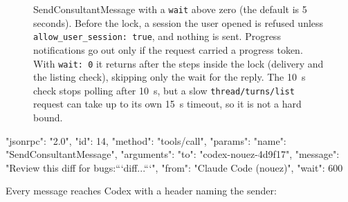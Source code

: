 \documentclass[10pt,a4paper]{article}
\newcommand{\lifelines}[2]{%
  \foreach \x/\name/\col in {#1} {%
    \node[actor, draw=\col, text=\col] at (\x,0) {\name};
    \draw[lifeline] (\x,-0.4) -- (\x,-#2);
  }}
\newcommand{\msg}[4]{\draw[call] (#2,-#1) -- node[above=1pt,lbl]{#4} (#3,-#1);}
\newcommand{\ret}[4]{\draw[reply] (#2,-#1) -- node[above=1pt,lbl]{#4} (#3,-#1);}
\newcommand{\side}[3]{\node[note, anchor=west] at (#2+0.15,-#1) {#3};}
\newcommand{\frm}[5]{%
  \draw[gray, rounded corners=2pt] (#3,-#1) rectangle (#4,-#2);
  \node[anchor=north west, font=\scriptsize\sffamily\bfseries, text=gray, fill=white, inner sep=2pt] at (#3,-#1) {#5};}
\newcommand{\code}[1]{\texttt{#1}}
\begin{document}
\begin{figure}[H]
\centering
{}
\caption{SendConsultantMessage with a \code{wait} above zero (the default is 5 seconds). Before the lock, a
session the user opened is refused unless \code{allow\_user\_session: true}, and nothing is sent.
Progress notifications go out only if the request carried a progress token. With
\code{wait: 0} it returns after the steps inside the lock (delivery and the listing check), skipping
only the wait for the reply. The 10~s check stops polling after 10~s, but a slow
\code{thread/turns/list} request can take up to its own 15~s timeout, so it is not a hard bound.}
\end{figure}

\begin{wire}[Request]
{"jsonrpc": "2.0", "id": 14, "method": "tools/call", "params": {"name": "SendConsultantMessage",
  "arguments": {"to": "codex-nouez-4d9f17", "message": "Review this diff for bugs:\n\n```diff\n...\n```",
                "from": "Claude Code (nouez)", "wait": 600}}}
\end{wire}

Every message reaches Codex with a header naming the sender:
\end{document}
